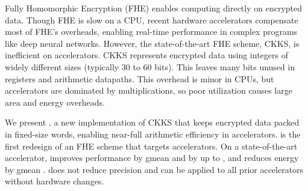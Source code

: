 \vspace{-0.15in} %

Fully Homomorphic Encryption (FHE) enables computing directly on encrypted
data.
Though FHE is slow on a CPU, recent hardware accelerators compensate most of
FHE's overheads, enabling real-time performance in complex programs like deep
neural networks.
However, the state-of-the-art FHE scheme, CKKS, is inefficient on accelerators.
CKKS represents encrypted data using
integers of widely different sizes (typically 30 to 60 bits).
This leaves many bits unused in registers and arithmetic datapaths.
This overhead is minor in CPUs, but accelerators are dominated by
multiplications, so poor utilization causes large area and energy
overheads.

We present \name, a new implementation of CKKS that keeps encrypted data packed
in fixed-size words, enabling near-full arithmetic efficiency in
accelerators.
\name is the first redesign of an FHE scheme that targets accelerators.
On a state-of-the-art accelerator,
\name improves performance by gmean  and by up to \OK{3\x},
and reduces energy by gmean .
\name does not reduce precision and can be applied to all prior accelerators without hardware changes.
